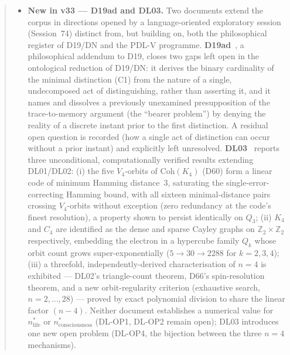 \documentclass[11pt,a4paper]{article}
\theoremstyle{plain}
\theoremstyle{definition}
\theoremstyle{remark}
\begin{document}
\begin{abstract}
\begin{itemize}
\item \textbf{New in v33 --- D19ad and DL03.} Two documents extend the corpus in directions opened by a language-oriented exploratory session (Session~74) distinct from, but building on, both the philosophical register of D19/DN and the PDL-V programme. \textbf{D19ad}~\cite{D19ad}, a philosophical addendum to D19, closes two gaps left open in the ontological reduction of D19/DN: it derives the binary cardinality of the minimal distinction (C1) from the nature of a single, undecomposed act of distinguishing, rather than asserting it, and it names and dissolves a previously unexamined presupposition of the trace-to-memory argument (the ``bearer problem'') by denying the reality of a discrete instant prior to the first distinction. A residual open question is recorded (how a single act of distinction can occur without a prior instant) and explicitly left unresolved. \textbf{DL03}~\cite{DL03} reports three unconditional, computationally verified results extending DL01/DL02: (i) the five $V_4$-orbits of $\mathrm{Coh}(K_4)$ (D60) form a linear code of minimum Hamming distance~3, saturating the single-error-correcting Hamming bound, with all sixteen minimal-distance pairs crossing $V_4$-orbits without exception (zero redundancy at the code's finest resolution), a property shown to persist identically on $Q_3$; (ii) $K_4$ and $C_4$ are identified as the dense and sparse Cayley graphs on $\mathbb{Z}_2\times\mathbb{Z}_2$ respectively, embedding the electron in a hypercube family $Q_k$ whose orbit count grows super-exponentially ($5\to30\to2288$ for $k=2,3,4$); (iii) a threefold, independently-derived characterisation of $n=4$ is exhibited --- DL02's triangle-count theorem, D66's spin-resolution theorem, and a new orbit-regularity criterion (exhaustive search, $n=2,\ldots,28$) --- proved by exact polynomial division to share the linear factor $(n-4)$. Neither document establishes a numerical value for $n^*_{\mathrm{life}}$ or $n^*_{\mathrm{consciousness}}$ (DL-OP1, DL-OP2 remain open); DL03 introduces one new open problem (DL-OP4, the bijection between the three $n=4$ mechanisms).
\end{itemize}

\end{abstract}
\end{document}
